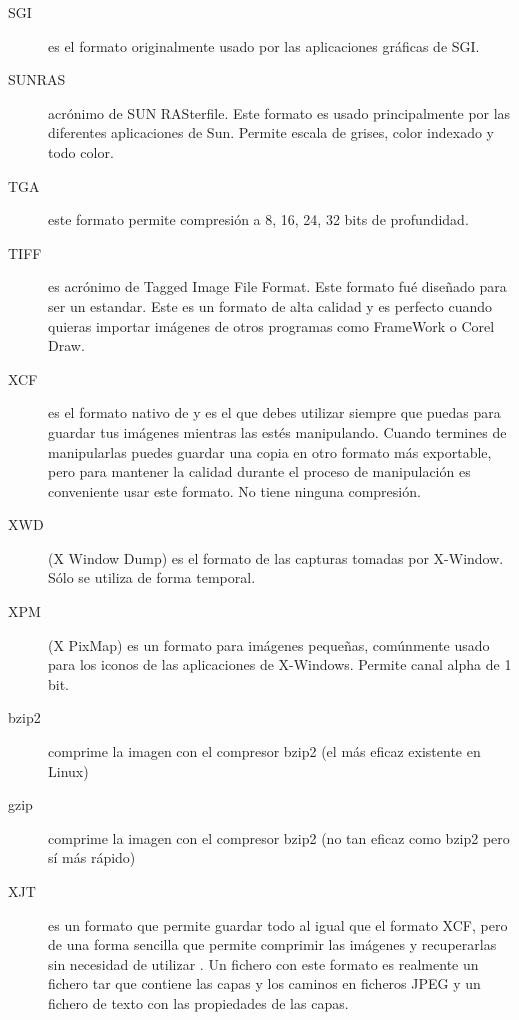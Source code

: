 \begin{description}
\item [SGI]  es el  formato originalmente  usado por  las aplicaciones
gráficas de SGI.

\item  [SUNRAS] acrónimo  de  SUN RASterfile.  Este  formato es  usado
principalmente por las diferentes  aplicaciones de Sun. Permite escala
de grises, color indexado y todo color.

\item [TGA]  este formato permite  compresión a 8,  16, 24, 32  bits de
profundidad.

\item [TIFF] es acrónimo de Tagged Image File Format. Este formato fué
diseñado para ser un estandar. Este es un formato de alta calidad y es
perfecto  cuando quieras  importar  imágenes de  otros programas  como
FrameWork o Corel Draw.



\item [XCF] es el  formato nativo de \gimp y es  el que debes utilizar
siempre  que  puedas para  guardar  tus  imágenes mientras  las  estés
manipulando. Cuando termines de  manipularlas puedes guardar una copia
en otro formato más exportable,  pero para mantener la calidad durante
el proceso de manipulación es  conveniente usar este formato. No tiene
ninguna compresión.

\item [XWD] (X Window Dump) es  el formato de las capturas tomadas por
X-Window. Sólo se utiliza de forma temporal.

\item  [XPM]  (X  PixMap)  es   un  formato  para  imágenes  pequeñas,
comúnmente usado  para los  iconos de  las aplicaciones  de X-Windows.
Permite canal alpha de 1 bit.

\item [bzip2] comprime la imagen con  el compresor {\sf bzip2} (el más
eficaz existente en Linux)

\item [gzip] comprime  la imagen con el compresor {\sf  bzip2} (no tan
eficaz como bzip2 pero sí más rápido)

\item [XJT]  es un formato  que permite guardar  todo al igual  que el
formato  XCF, pero  de una  forma sencilla  que permite  comprimir las
imágenes y  recuperarlas sin necesidad  de utilizar \gimp.  Un fichero
con este formato es realmente un  fichero tar que contiene las capas y
los caminos en ficheros JPEG y un fichero de texto con las propiedades
de las capas.

\end{description}

